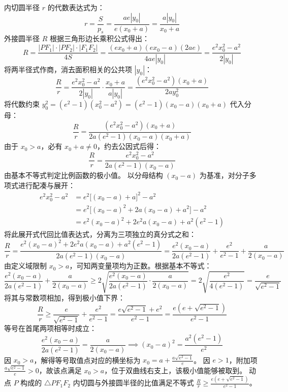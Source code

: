 \begin{solution}
内切圆半径 $r$ 的代数表达式为：
\[ r = \frac{S}{p_s} = \frac{ae|y_0|}{e(x_0 + a)} = \frac{a|y_0|}{x_0 + a} \]
外接圆半径 $R$ 根据三角形边长乘积公式得出：
\[ R = \frac{|PF_1| \cdot |PF_2| \cdot |F_1F_2|}{4S} = \frac{(ex_0 + a)(ex_0 - a)(2ae)}{4ae|y_0|} = \frac{e^2 x_0^2 - a^2}{2|y_0|} \]
将两半径式作商，消去面积相关的公共项 $|y_0|$：
\[ \frac{R}{r} = \frac{e^2 x_0^2 - a^2}{2|y_0|} \cdot \frac{x_0 + a}{a|y_0|} = \frac{(e^2 x_0^2 - a^2)(x_0 + a)}{2a y_0^2} \]
将代数约束 $y_0^2 = (e^2 - 1)(x_0^2 - a^2) = (e^2 - 1)(x_0 - a)(x_0 + a)$ 代入分母：
\[ \frac{R}{r} = \frac{(e^2 x_0^2 - a^2)(x_0 + a)}{2a(e^2 - 1)(x_0 - a)(x_0 + a)} \]
由于 $x_0 > a$，必有 $x_0 + a \neq 0$，约去公因式后得：
\[ \frac{R}{r} = \frac{e^2 x_0^2 - a^2}{2a(e^2 - 1)(x_0 - a)} \]
由基本不等式判定比例函数的极小值。
以分母结构 $(x_0 - a)$ 为基准，对分子多项式进行配凑与展开：
\begin{align*}
e^2 x_0^2 - a^2 &= e^2 \big[ (x_0 - a) + a \big]^2 - a^2 \\
&= e^2 \big[ (x_0 - a)^2 + 2a(x_0 - a) + a^2 \big] - a^2 \\
&= e^2 (x_0 - a)^2 + 2e^2 a (x_0 - a) + a^2 (e^2 - 1)
\end{align*}
将此展开式代回比值表达式，分离为三项独立的真分式之和：
\[ \frac{R}{r} = \frac{e^2 (x_0 - a)^2 + 2e^2 a (x_0 - a) + a^2 (e^2 - 1)}{2a(e^2 - 1)(x_0 - a)} = \frac{e^2(x_0 - a)}{2a(e^2 - 1)} + \frac{e^2}{e^2 - 1} + \frac{a}{2(x_0 - a)} \]
由定义域限制 $x_0 > a$，可知两变量项均为正数。根据基本不等式：
\[ \frac{e^2(x_0 - a)}{2a(e^2 - 1)} + \frac{a}{2(x_0 - a)} \ge 2\sqrt{ \frac{e^2(x_0 - a)}{2a(e^2 - 1)} \cdot \frac{a}{2(x_0 - a)} } = 2\sqrt{ \frac{e^2}{4(e^2 - 1)} } = \frac{e}{\sqrt{e^2 - 1}} \]
将其与常数项相加，得到极小值下界：
\[ \frac{R}{r} \ge \frac{e}{\sqrt{e^2 - 1}} + \frac{e^2}{e^2 - 1} = \frac{e\sqrt{e^2 - 1} + e^2}{e^2 - 1} = \frac{e(e + \sqrt{e^2 - 1})}{e^2 - 1} \]
等号在首尾两项相等时成立：
\[ \frac{e^2(x_0 - a)}{2a(e^2 - 1)} = \frac{a}{2(x_0 - a)} \implies (x_0 - a)^2 = \frac{a^2(e^2 - 1)}{e^2} \]
因 $x_0 > a$，解得等号取值点对应的横坐标为 $x_0 = a + \frac{a\sqrt{e^2 - 1}}{e}$。
因 $e > 1$，附加项 $\frac{a\sqrt{e^2 - 1}}{e} > 0$，故该点满足 $x_0 > a$，位于双曲线右支上，该极小值能够被取到。
动点 $P$ 构成的 $\triangle PF_1F_2$ 内切圆与外接圆半径的比值满足不等式 $\frac{R}{r} \ge \frac{e(e + \sqrt{e^2 - 1})}{e^2 - 1}$。
\end{solution}








